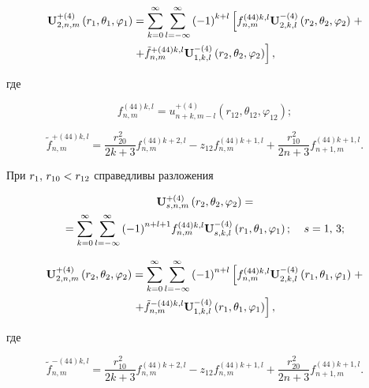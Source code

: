 \begin{russian}
\begin{theorem}
\begin{multline}\label{eq:1:96}
{\bf{U}}_{2,n,m}^{ + (4)}\left( {{r_1},{\theta _1},{\varphi _1}} \right) = \sum\limits_{k = 0}^\infty  {\sum\limits_{l =  - \infty }^\infty  {{{( - 1)}^{k + l}}} } \left[ {f_{n,m}^{(44)k,l}{\bf{U}}_{2,k,l}^{ - (4)}\left( {{r_2},{\theta _2},{\varphi _2}} \right)} \right. + \\
\left. { + \tilde f_{n,m}^{ + (44)k,l}{\bf{U}}_{1,k,l}^{ - (4)}\left( {{r_2},{\theta _2},{\varphi _2}} \right)} \right],
\end{multline}

\noindent где

\begin{equation}\label{eq:1:97}
f_{n,m}^{(44)k,l} = u_{n + k,m - l}^{ + (4)}\left( {{r_{12}},{\theta _{12}},{\varphi _{12}}} \right);
\end{equation}

\begin{equation}\label{eq:1:98}
\tilde f_{n,m}^{ + (44)k,l} = \frac{{r_{20}^2}}{{2k + 3}}f_{n,m}^{(44)k + 2,l} - {z_{12}}f_{n,m}^{(44)k + 1,l} + \frac{{r_{10}^2}}{{2n + 3}}f_{n + 1,m}^{(44)k + 1,l}.
\end{equation}

При ${r_1},{\mkern 1mu} {\kern 1pt} {r_{10}} < {r_{12}}$ справедливы разложения

\begin{multline}\label{eq:1:99}
{\bf{U}}_{s,n,m}^{ + (4)}\left( {{r_2},{\theta _2},{\varphi _2}} \right) = \\
= \sum\limits_{k = 0}^\infty  {\sum\limits_{l =  - \infty }^\infty  {{{( - 1)}^{n + l + 1}}} } f_{n,m}^{(44)k,l}{\bf{U}}_{s,k,l}^{ - (4)}\left( {{r_1},{\theta _1},{\varphi _1}} \right); \quad {\kern 1pt} s = 1,{\mkern 1mu} {\kern 1pt} 3;
\end{multline}

\begin{multline}\label{eq:1:100}
{\bf{U}}_{2,n,m}^{ + (4)}\left( {{r_2},{\theta _2},{\varphi _2}} \right) = \sum\limits_{k = 0}^\infty  {\sum\limits_{l =  - \infty }^\infty  {{{( - 1)}^{n + l}}} } \left[ {f_{n,m}^{(44)k,l}{\bf{U}}_{2,k,l}^{ - (4)}\left( {{r_1},{\theta _1},{\varphi _1}} \right)} \right. + \\
\left. { + \tilde f_{n,m}^{ - (44)k,l}{\bf{U}}_{1,k,l}^{ - (4)}\left( {{r_1},{\theta _1},{\varphi _1}} \right)} \right],
\end{multline}

\noindent где

\begin{equation}\label{eq:1:101}
\tilde f_{n,m}^{ - (44)k,l} = \frac{{r_{10}^2}}{{2k + 3}}f_{n,m}^{(44)k + 2,l} - {z_{12}}f_{n,m}^{(44)k + 1,l} + \frac{{r_{20}^2}}{{2n + 3}}f_{n + 1,m}^{(44)k + 1,l}.
\end{equation}
\end{theorem}


\end{russian}

